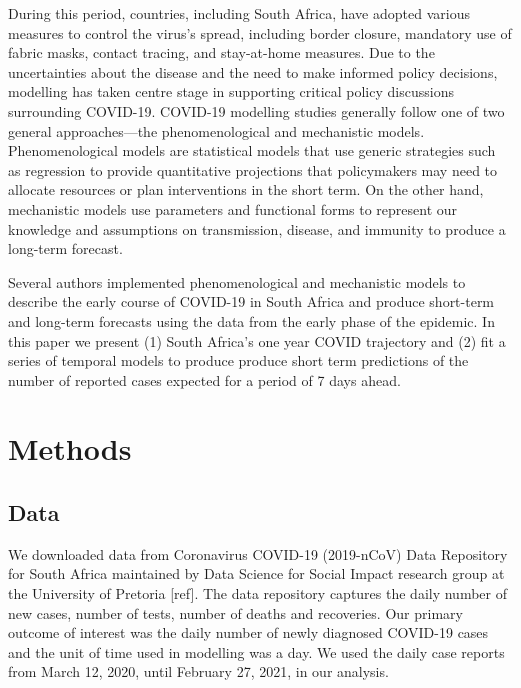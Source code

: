 \documentclass[10pt,letterpaper]{article}
\begin{document}
During this period, countries, including South Africa, have adopted various measures to control the virus's spread, including border closure, mandatory use of fabric masks, contact tracing, and stay-at-home measures. Due to the uncertainties about the disease and the need to make informed policy decisions, modelling has taken centre stage in supporting critical policy discussions surrounding COVID-19. COVID-19 modelling studies generally follow one of two general approaches—the phenomenological and mechanistic models. Phenomenological models are statistical models that use generic strategies such as regression to provide quantitative projections that policymakers may need to allocate resources or plan interventions in the short term. On the other hand, mechanistic models use parameters and functional forms to represent our knowledge and assumptions on transmission, disease, and immunity to produce a long-term forecast. 

Several authors implemented phenomenological and mechanistic models to describe the early course of COVID-19 in South Africa and produce short-term and long-term forecasts using the data from the early phase of the epidemic. In this paper we present (1) South Africa's one year COVID trajectory and (2) fit a series of temporal models to produce produce short term predictions of the number of reported cases expected for a period of 7 days ahead. 


\hypertarget{methods}{%
\section{Methods}\label{methods}}

\hypertarget{data}{%
\subsection{Data}\label{data}}

We downloaded data from Coronavirus COVID-19 (2019-nCoV) Data Repository
for South Africa maintained by Data Science for Social Impact research
group at the University of Pretoria {[}ref{]}. The data repository
captures the daily number of new cases, number of tests, number of
deaths and recoveries. Our primary outcome of interest was the daily
number of newly diagnosed COVID-19 cases and the unit of time used in
modelling was a day. We used the daily case reports from March 12, 2020,
until February 27, 2021, in our analysis.
\end{document}
